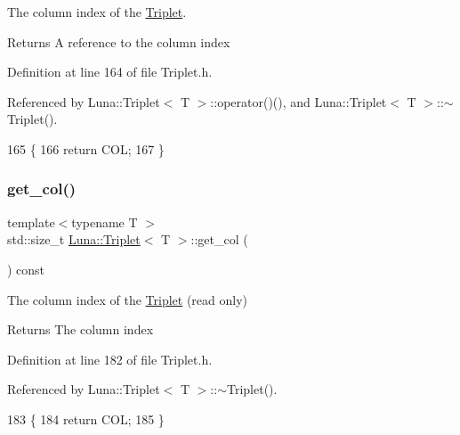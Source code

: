 The column index of the \hyperlink{classLuna_1_1Triplet}{Triplet}. 

\begin{DoxyReturn}{Returns}
A reference to the column index 
\end{DoxyReturn}


Definition at line 164 of file Triplet.\+h.



Referenced by Luna\+::\+Triplet$<$ T $>$\+::operator()(), and Luna\+::\+Triplet$<$ T $>$\+::$\sim$\+Triplet().


\begin{DoxyCode}
165     \{
166         \textcolor{keywordflow}{return} COL;
167     \}
\end{DoxyCode}
\mbox{\label{classLuna_1_1Triplet_a7d5bdd021a6191f49e349795a304db60}} 
\subsubsection{\texorpdfstring{get\+\_\+col()}{get\_col()}}
{\footnotesize\ttfamily template$<$typename T $>$ \\
std\+::size\+\_\+t \hyperlink{classLuna_1_1Triplet}{Luna\+::\+Triplet}$<$ T $>$\+::get\+\_\+col (\begin{DoxyParamCaption}{ }\end{DoxyParamCaption}) const\hspace{0.3cm}{\ttfamily [inline]}}



The column index of the \hyperlink{classLuna_1_1Triplet}{Triplet} (read only) 

\begin{DoxyReturn}{Returns}
The column index 
\end{DoxyReturn}


Definition at line 182 of file Triplet.\+h.



Referenced by Luna\+::\+Triplet$<$ T $>$\+::$\sim$\+Triplet().


\begin{DoxyCode}
183     \{
184         \textcolor{keywordflow}{return} COL;
185     \}
\end{DoxyCode}
\mbox{\label{classLuna_1_1Triplet_a78f98c86e79867cccbf5429945366036}} 

